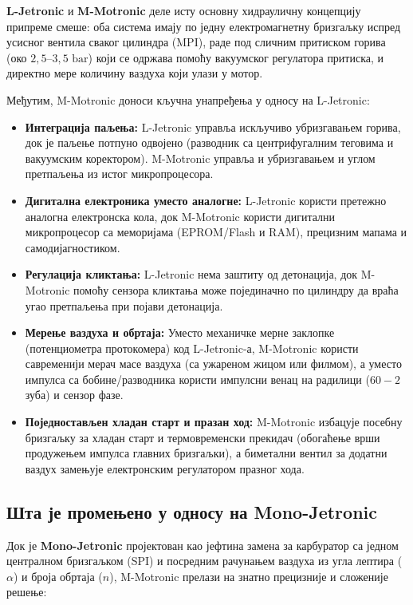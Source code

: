 \documentclass[12pt]{article}
\begin{document}
\textbf{L-Jetronic} и \textbf{M-Motronic} деле исту основну хидрауличну
концепцију припреме смеше: оба система имају по једну електромагнетну бризгаљку
испред усисног вентила сваког цилиндра (MPI), раде под сличним притиском горива
(око $2{,}5\text{--}3{,}5\text{ bar}$) који се одржава помоћу вакуумског регулатора
притиска, и директно мере количину ваздуха који улази у мотор.

Међутим, M-Motronic доноси кључна унапређења у односу на L-Jetronic:

\begin{itemize}[noitemsep]
    \item \textbf{Интеграција паљења:} L-Jetronic управља искључиво убризгавањем
          горива, док је паљење потпуно одвојено (разводник са центрифугалним
          теговима и вакуумским коректором). M-Motronic управља и убризгавањем
          и углом претпаљења из истог микропроцесора.
    \item \textbf{Дигитална електроника уместо аналогне:} L-Jetronic користи
          претежно аналогна електронска кола, док M-Motronic користи дигитални
          микропроцесор са меморијама (EPROM/Flash и RAM), прецизним мапама и
          самодијагностиком.
    \item \textbf{Регулација кликтања:} L-Jetronic нема заштиту од детонација,
          док M-Motronic помоћу сензора кликтања може појединачно по цилиндру
          да враћа угао претпаљења при појави детонација.
    \item \textbf{Мерење ваздуха и обртаја:} Уместо механичке мерне заклопке
          (потенциометра протокомера) код L-Jetronic-а, M-Motronic користи
          савременији мерач масе ваздуха (са ужареном жицом или филмом), а
          уместо импулса са бобине/разводника користи импулсни венац на
          радилици ($60-2$ зуба) и сензор фазе.
    \item \textbf{Поједностављен хладан старт и празан ход:} M-Motronic избацује
          посебну бризгаљку за хладан старт и термовременски прекидач (обогаћење
          врши продужењем импулса главних бризгаљки), а биметални вентил за
          додатни ваздух замењује електронским регулатором празног хода.
\end{itemize}

\subsection{Шта је промењено у односу на Mono-Jetronic}

Док је \textbf{Mono-Jetronic} пројектован као јефтина замена за карбуратор са
једном централном бризгаљком (SPI) и посредним рачунањем ваздуха из угла лептира
($\alpha$) и броја обртаја ($n$), M-Motronic прелази на знатно прецизније и
сложеније решење:
\end{document}
